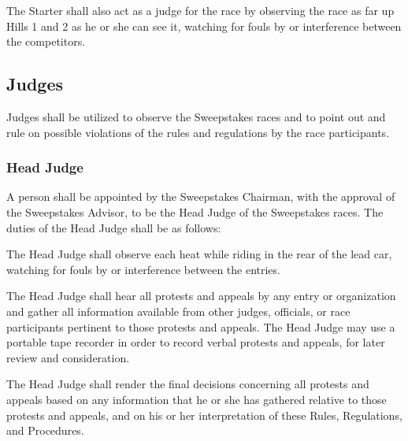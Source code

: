 The Starter shall also act as a judge for the race by observing the race as far up Hills 1 and 2 as he or she can see it, watching for fouls by or interference between the competitors.

\subsection{Judges}

Judges shall be utilized to observe the Sweepstakes races and to point out and rule on possible violations of the rules and regulations by the race participants.

\subsubsection{Head Judge}

A person shall be appointed by the Sweepstakes Chairman, with the approval of the Sweepstakes Advisor, to be the Head Judge of the Sweepstakes races. The duties of the Head Judge shall be as follows:

The Head Judge shall observe each heat while riding in the rear of the lead car, watching for fouls by or interference between the entries.

The Head Judge shall hear all protests and appeals by any entry or organization and gather all information available from other judges, officials, or race participants pertinent to those protests and appeals. The Head Judge may use a portable tape recorder in order to record verbal protests and appeals, for later review and consideration.

The Head Judge shall render the final decisions concerning all protests and appeals based on any information that he or she has gathered relative to those protests and appeals, and on his or her interpretation of these Rules, Regulations, and Procedures.

